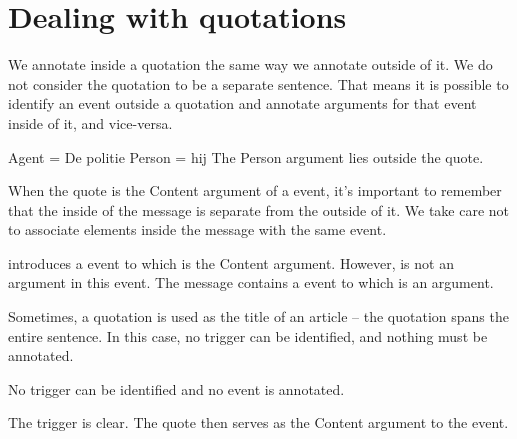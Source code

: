 \section{Dealing with quotations}

We annotate inside a quotation the same way we annotate outside of it. We do not consider the quotation to be a separate sentence. That means it is possible to identify an event outside a quotation and annotate arguments for that event inside of it, and vice-versa.

\begin{exe}
    \ex {}
        \expl {}
        \expl Agent = De politie
        \expl Person = hij
        \expl The Person argument lies outside the quote.
\end{exe}

When the quote is the Content argument of a  event, it's important to remember that the inside of the message is separate from the outside of it. We take care not to associate elements inside the message with the same  event.

\begin{exe}
    \ex {} 
        \expl {} introduces a  event to which  is the Content argument. However,  is not an argument in this event. The message contains a  event to which  is an argument.
\end{exe}

Sometimes, a quotation is used as the title of an article -- the quotation spans the entire sentence. In this case, no trigger can be identified, and nothing must be annotated.

\begin{exe}
    \ex {} 
        \expl No trigger can be identified and no event is annotated.
    
    \ex {} 
        \expl The trigger is clear. The quote then serves as the Content argument to the  event.
\end{exe}



